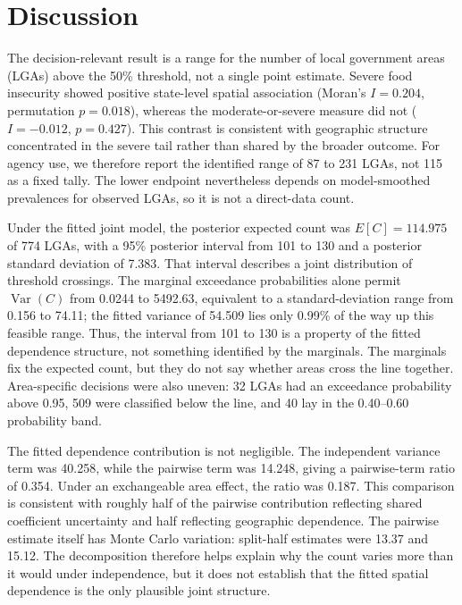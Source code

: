 \section{Discussion}

The decision-relevant result is a range for the number of local government areas (LGAs) above the 50\% threshold, not a single point estimate. Severe food insecurity showed positive state-level spatial association (Moran's \(I=0.204\), permutation \(p=0.018\)), whereas the moderate-or-severe measure did not (\(I=-0.012\), \(p=0.427\)). This contrast is consistent with geographic structure concentrated in the severe tail rather than shared by the broader outcome. For agency use, we therefore report the identified range of 87 to 231 LGAs, not 115 as a fixed tally. The lower endpoint nevertheless depends on model-smoothed prevalences for observed LGAs, so it is not a direct-data count.

Under the fitted joint model, the posterior expected count was \(E[C]=114.975\) of 774 LGAs, with a 95\% posterior interval from 101 to 130 and a posterior standard deviation of 7.383. That interval describes a joint distribution of threshold crossings. The marginal exceedance probabilities alone permit \(\operatorname{Var}(C)\) from 0.0244 to 5492.63, equivalent to a standard-deviation range from 0.156 to 74.11; the fitted variance of 54.509 lies only 0.99\% of the way up this feasible range. Thus, the interval from 101 to 130 is a property of the fitted dependence structure, not something identified by the marginals. The marginals fix the expected count, but they do not say whether areas cross the line together. Area-specific decisions were also uneven: 32 LGAs had an exceedance probability above 0.95, 509 were classified below the line, and 40 lay in the 0.40--0.60 probability band.

The fitted dependence contribution is not negligible. The independent variance term was 40.258, while the pairwise term was 14.248, giving a pairwise-term ratio of 0.354. Under an exchangeable area effect, the ratio was 0.187. This comparison is consistent with roughly half of the pairwise contribution reflecting shared coefficient uncertainty and half reflecting geographic dependence. The pairwise estimate itself has Monte Carlo variation: split-half estimates were 13.37 and 15.12. The decomposition therefore helps explain why the count varies more than it would under independence, but it does not establish that the fitted spatial dependence is the only plausible joint structure.

